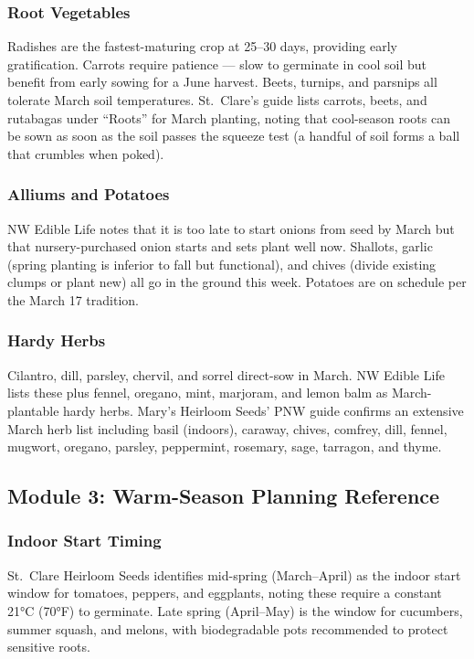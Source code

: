 \documentclass[11pt,letterpaper]{article}
\begin{document}
\subsubsection{Root Vegetables}

Radishes are the fastest-maturing crop at 25--30 days, providing early gratification. Carrots require patience --- slow to germinate in cool soil but benefit from early sowing for a June harvest. Beets, turnips, and parsnips all tolerate March soil temperatures. St.\ Clare's guide lists carrots, beets, and rutabagas under ``Roots'' for March planting, noting that cool-season roots can be sown as soon as the soil passes the squeeze test (a handful of soil forms a ball that crumbles when poked).

\subsubsection{Alliums and Potatoes}

NW Edible Life notes that it is too late to start onions from seed by March but that nursery-purchased onion starts and sets plant well now. Shallots, garlic (spring planting is inferior to fall but functional), and chives (divide existing clumps or plant new) all go in the ground this week. Potatoes are on schedule per the March 17 tradition.

\subsubsection{Hardy Herbs}

Cilantro, dill, parsley, chervil, and sorrel direct-sow in March. NW Edible Life lists these plus fennel, oregano, mint, marjoram, and lemon balm as March-plantable hardy herbs. Mary's Heirloom Seeds' PNW guide confirms an extensive March herb list including basil (indoors), caraway, chives, comfrey, dill, fennel, mugwort, oregano, parsley, peppermint, rosemary, sage, tarragon, and thyme.

\subsection{Module 3: Warm-Season Planning Reference}

\subsubsection{Indoor Start Timing}

St.\ Clare Heirloom Seeds identifies mid-spring (March--April) as the indoor start window for tomatoes, peppers, and eggplants, noting these require a constant 21°C (70°F) to germinate. Late spring (April--May) is the window for cucumbers, summer squash, and melons, with biodegradable pots recommended to protect sensitive roots.
\end{document}
